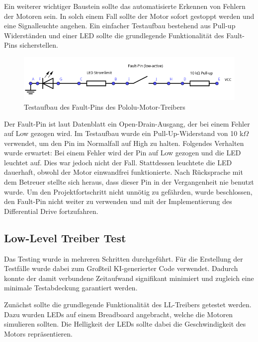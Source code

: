 Ein weiterer wichtiger Baustein sollte das automatisierte Erkennen von Fehlern der Motoren sein. In solch einem Fall sollte der Motor sofort gestoppt werden und eine Signalleuchte angehen. Ein einfacher Testaufbau bestehend aus Pull-up Widerständen und einer LED sollte die grundlegende Funktionalität des Fault-Pins sicherstellen.

\begin{figure}[h]
    \centering
    \includegraphics[width=\textwidth]{images/motor_driver_fault_pin.png}
    \caption{Testaufbau des Fault-Pins des Pololu-Motor-Treibers}
    \label{fig:motor_driver_fault_pin}
\end{figure}

Der Fault-Pin ist laut Datenblatt ein Open-Drain-Ausgang, der bei einem Fehler auf Low gezogen wird. Im Testaufbau wurde ein Pull-Up-Widerstand von 10 k$\Omega$ verwendet, um den Pin im Normalfall auf High zu halten. Folgendes Verhalten wurde erwartet: Bei einem Fehler wird der Pin auf Low gezogen und die LED leuchtet auf. Dies war jedoch nicht der Fall. Stattdessen leuchtete die LED dauerhaft, obwohl der Motor einwandfrei funktionierte. Nach Rücksprache mit dem Betreuer stellte sich heraus, dass dieser Pin in der Vergangenheit nie benutzt wurde. Um den Projektfortschritt nicht unnötig zu gefährden, wurde beschlossen, den Fault-Pin nicht weiter zu verwenden und mit der Implementierung des Differential Drive fortzufahren.

\subsection{Low-Level Treiber Test}

Das Testing wurde in mehreren Schritten durchgeführt. Für die Erstellung der Testfälle wurde dabei zum Großteil KI-generierter Code verwendet. Dadurch konnte der damit verbundene Zeitaufwand signifikant minimiert und zugleich eine minimale Testabdeckung garantiert werden. \newline

Zunächst sollte die grundlegende Funktionalität des LL-Treibers getestet werden. Dazu wurden LEDs auf einem Breadboard angebracht, welche die Motoren simulieren sollten. Die Helligkeit der LEDs sollte dabei die Geschwindigkeit des Motors repräsentieren. \newline

